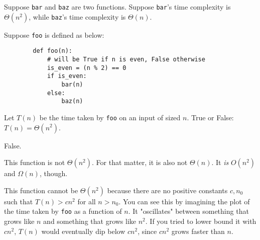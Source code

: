 \begin{prob}
    Suppose \texttt{bar} and \texttt{baz} are two functions.
    Suppose \texttt{bar}'s time complexity is $\Theta(n^2)$, while \texttt{baz}'s
    time complexity is $\Theta(n)$.

    Suppose \texttt{foo} is defined as below:

    \begin{verbatim}
        def foo(n):
            # will be True if n is even, False otherwise
            is_even = (n % 2) == 0
            if is_even:
                bar(n)
            else:
                baz(n)
    \end{verbatim}

    Let $T(n)$ be the time taken by \texttt{foo} on an input of sized $n$.
    True or False: $T(n) = \Theta(n^2)$.

    \tF{}

    \begin{soln}
        False.

        This function is not $\Theta(n^2)$. For that matter, it is also not $\Theta(n)$.
        It \textit{is} $O(n^2)$ and $\Omega(n)$, though.

        This function cannot be $\Theta(n^2)$ because there are no positive constants
        $c, n_0$ such that $T(n) > c n^2$ for all $n > n_0$. You can see this by imagining
        the plot of the time taken by \texttt{foo} as a function of $n$.
        It "oscillates" between something that grows like $n$ and something that grows
        like $n^2$. If you tried to lower bound it with $cn^2$, $T(n)$ would eventually
        dip below $cn^2$, since $cn^2$ grows faster than $n$.
    \end{soln}
\end{prob}
